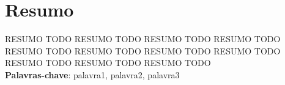 \chapter{Resumo}

RESUMO TODO
RESUMO TODO
RESUMO TODO
RESUMO TODO
RESUMO TODO
RESUMO TODO
RESUMO TODO
RESUMO TODO
RESUMO TODO
RESUMO TODO
RESUMO TODO
\\

\noindent \textbf{Palavras-chave}: palavra1, palavra2, palavra3
